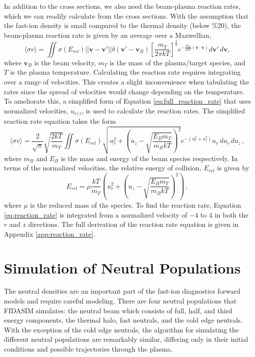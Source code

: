 In addition to the cross sections, we also need the beam-plasma reaction rates, which we can readily calculate from the cross sections. With the assumption that the fast-ion density is small compared to the thermal density (below \%20), the beam-plasma reaction rate is given by an average over a Maxwellian,
\begin{equation}\label{eq:full_reaction_rate}
    \langle \sigma v \rangle = \iint \sigma(E_{rel}) ||\mathbf{v} - \mathbf{v'}|| \delta(\mathbf{v'}-\mathbf{v}_B) \left [ \frac{m_T}{2\pi kT} \right ]^{\frac{3}{2}} e^{-\frac{m_T}{2kT}(\mathbf{v}\cdot\mathbf{v})} d\mathbf{v}'\,d\mathbf{v} ,
\end{equation}
where $\mathbf{v}_B$ is the beam velocity, $m_T$ is the mass of the plasma/target species, and $T$ is the plasma temperature. Calculating the reaction rate requires integrating over a range of velocities. This creates a slight inconvenience when tabulating the rates since the spread of velocities would change depending on the temperature. To ameliorate this, a simplified form of Equation \ref{eq:full_reaction_rate} that uses normalized velocities, $u_{r/z}$, is used to calculate the reaction rates. The simplified reaction rate equation takes the form
\begin{equation}\label{eq:reaction_rate}
\langle \sigma v \rangle = \frac{2}{\sqrt{\pi}}\sqrt{\frac{2kT}{m_T}} \iint \sigma(E_{rel}) \sqrt{u_r^2 + \left (u_z - \sqrt{\frac{E_B m_T}{m_B kT}}\right)^2}  e^{-(u_r^2 + u_z^2)}u_r \,du_r\,du_z\,,
\end{equation}
where $m_B$ and $E_B$ is the mass and energy of the beam species respectively. In terms of the normalized velocities, the relative energy of collision, $E_{rel}$ is given by
\begin{equation}\label{eq:e_rel}
E_{rel} = \mu \frac{kT}{m_T} \left ( u_r^2 + \left(u_z - \sqrt{\frac{E_B m_T}{m_B kT}}\right)^2 \right )\,,
\end{equation}
where $\mu$ is the reduced mass of the species.
To find the reaction rate, Equation \ref{eq:reaction_rate} is integrated from a normalized velocity of $-4$ to $4$ in both the $r$ and $z$ directions.
The full derivation of the reaction rate equation is given in Appendix \ref{app:reaction_rate}. 

\section{Simulation of Neutral Populations}
The neutral densities are an important part of the fast-ion diagnostics forward models and require careful modeling.
There are four neutral populations that FIDASIM simulates: the neutral beam which consists of full, half, and third energy components, the thermal halo, fast neutrals, and the cold edge neutrals.
With the exception of the cold edge neutrals, the algorithm for simulating the different neutral populations are remarkably similar, differing only in their initial conditions and possible trajectories through the plasma.

